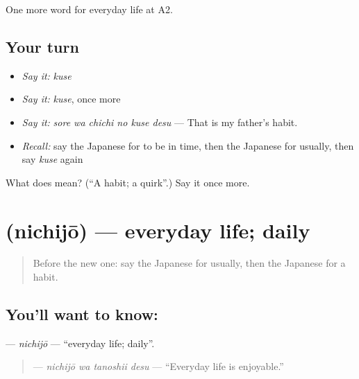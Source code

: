 \begin{grammarlens}[title={What you've built}]
One more word for everyday life at A2.
\end{grammarlens}

\subsection*{Your turn}
\begin{itemize}
\raggedright
  \item \emph{Say it:} \emph{kuse}
  \item \emph{Say it:} \emph{kuse}, once more
  \item \emph{Say it:} \emph{sore wa chichi no kuse desu} — That is my father's habit.
  \item \emph{Recall:} say the Japanese for to be in time, then the Japanese for usually, then say \emph{kuse} again
\end{itemize}

\begin{tcolorbox}[breakable,colback=teal!4,colframe=teal!35!black,title={Before you move on}]
What does  mean? (\textquotedblleft{}A habit; a quirk\textquotedblright{}.) Say it once more.
\end{tcolorbox}
\section[\texorpdfstring{\ja{にちじょう} (nichijō)}{にちじょう (nichijō)}]{ (nichijō) — everyday life; daily}

\label{lesson:JA-C154-nichijou}



\begin{quote}
Before the new one: say the Japanese for usually, then the Japanese for a habit.
\end{quote}

\subsection*{You'll want to know: }
\textbf{} — \emph{nichijō} — \textquotedblleft{}everyday life; daily\textquotedblright{}.

\begin{quote}
\textbf{ } — \emph{nichijō wa tanoshii desu} — \textquotedblleft{}Everyday life is enjoyable.\textquotedblright{}
\end{quote}

